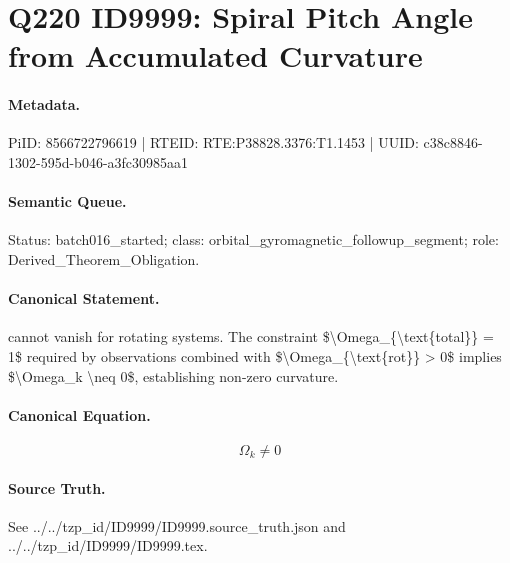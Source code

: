 \section*{Q220 ID9999: Spiral Pitch Angle from Accumulated Curvature}
\paragraph{Metadata.}
PiID: 8566722796619 | RTEID: RTE:P38828.3376:T1.1453 | UUID: c38c8846-1302-595d-b046-a3fc30985aa1

\paragraph{Semantic Queue.}
Status: batch016\_started; class: orbital\_gyromagnetic\_followup\_segment; role: Derived\_Theorem\_Obligation.

\paragraph{Canonical Statement.}
cannot vanish for rotating systems. The constraint \$\textbackslash{}Omega\_\{\textbackslash{}text\{total\}\} = 1\$ required by observations combined with \$\textbackslash{}Omega\_\{\textbackslash{}text\{rot\}\} > 0\$ implies \$\textbackslash{}Omega\_k \textbackslash{}neq 0\$, establishing non-zero curvature.

\paragraph{Canonical Equation.}
\[
\Omega_k \neq 0
\]

\paragraph{Source Truth.}
See ../../tzp\_id/ID9999/ID9999.source\_truth.json and ../../tzp\_id/ID9999/ID9999.tex.
